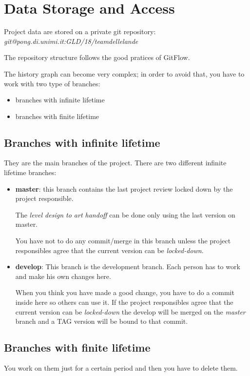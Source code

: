 \section{Data Storage and Access}
Project data are stored on a private git repository:\\
	\textit{git@pong.di.unimi.it:GLD/18/teamdellelande}

The repository structure follows the good pratices of GitFlow.

The history graph can become very complex; in order to avoid that, you have to work with two type of branches:
\begin{itemize}
	\item branches with infinite lifetime
	\item branches with finite lifetime
\end{itemize}

\subsection{Branches with infinite lifetime}
They are the main branches of the project. There are two different infinite lifetime branches:
\begin{itemize}
\item \textbf{master}: this branch contains the last project review locked down by the project responsible.

  The \textit{level design to art handoff} can be done only using the last version on master.

  You have not to do any commit/merge in this branch unless the project responsibles agree that the current version can be \textit{locked-down}.

\item \textbf{develop}: This branch is the development branch. Each person has to work and make his own changes here.

  When you think you have made a good change, you have to do a commit inside here so others can use it.
  If the project responsibles agree that the current version can be \textit{locked-down} the develop will be merged on the \textit{master} branch and a TAG version will be bound to that commit.
\end{itemize}

\subsection{Branches with finite lifetime}
You work on them just for a certain period and then you have to delete them.

